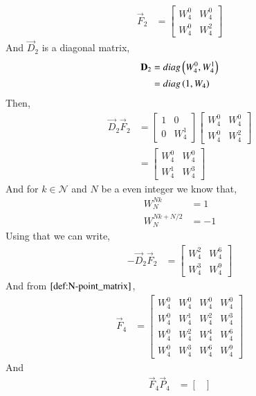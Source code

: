 \documentclass[journal,12pt,twocolumn]{IEEEtran}
\renewcommand\thesection{\arabic{section}}
\begin{document}
\begin{enumerate}[label=\arabic*.,ref=\thesection.\theenumi]
\begin{align}
		\vec{F}_{2} &= 
		\begin{bmatrix}
			W_4^{0} & W_4^{0} \\
			W_4^{0} & W_4^{2}
		\end{bmatrix} 
	\end{align}
	And $\vec{D}_{2}$ is a diagonal matrix,
	\begin{align}
		\mathbf{D}_{2} &= diag\left(W_4^0,W_4^1\right) \\
		&= diag\left(1,W_4\right)
	\end{align}
	Then,
	\begin{align}
		\vec{D}_2\vec{F}_2 &=\begin{bmatrix}
			1 & 0 \\
			0 & W_4^{1}
		\end{bmatrix}  
		\begin{bmatrix}
			W_4^{0} & W_4^{0} \\
			W_4^{0} & W_4^{2}
		\end{bmatrix} \\
		&= \begin{bmatrix}
			W_4^{0} & W_4^{0} \\
			W_4^{1} & W_4^{3}
		\end{bmatrix}
	\end{align}
	And for $k \in \mathcal{N}$ and $N$ be a even integer we know that,
	\begin{align}
		W_{N}^{Nk} &= 1 \label{fft-1}\\
		W_{N}^{Nk + N/2} &= -1 \label{fft-2}
	\end{align}
	Using that we can write,
	\begin{align}
		-\vec{D}_2\vec{F}_2 &= \begin{bmatrix}
			W_4^{2} & W_4^{6} \\
			W_4^{3} & W_4^{9}
		\end{bmatrix}
	\end{align}
	And from $\eqref{def:N-point_matrix}$,
	\begin{align}
		\vec{F}_{4} &= \begin{bmatrix}
			W_4^0 &  W_4^0& W_4^0 & W_4^0  \\
			W_4^0 & W_4^1 & W_4^2 & W_4^3  \\
			W_4^0 & W_4^2 & W_4^4 &  W_4^6 \\
			W_4^0 & W_4^3 & W_4^6 & W_4^9   
		\end{bmatrix}
	\end{align}
	And 
	\begin{align}
		\vec{F}_{4}\vec{P}_{4} &= \begin{bmatrix}

\end{bmatrix}
\end{align}
\end{enumerate}
\end{document}

